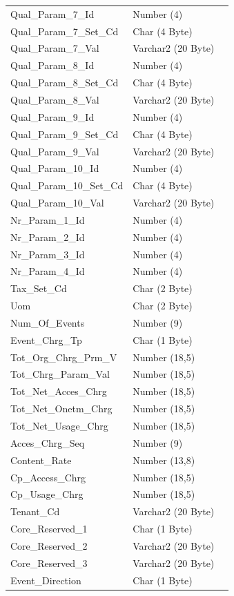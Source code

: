 \documentclass[12pt,twoside]{article}
\begin{document}
\begin{longtable}{l|l|l}
Qual\_Param\_7\_Id & Number (4) & \\
Qual\_Param\_7\_Set\_Cd & Char (4 Byte) & \\
Qual\_Param\_7\_Val & Varchar2 (20 Byte) & \\
Qual\_Param\_8\_Id & Number (4) & \\
Qual\_Param\_8\_Set\_Cd & Char (4 Byte) & \\
Qual\_Param\_8\_Val & Varchar2 (20 Byte) & \\
Qual\_Param\_9\_Id & Number (4) & \\
Qual\_Param\_9\_Set\_Cd & Char (4 Byte) & \\
Qual\_Param\_9\_Val & Varchar2 (20 Byte) & \\
Qual\_Param\_10\_Id & Number (4) & \\
Qual\_Param\_10\_Set\_Cd & Char (4 Byte) & \\
Qual\_Param\_10\_Val & Varchar2 (20 Byte) & \\
Nr\_Param\_1\_Id & Number (4) & \\
Nr\_Param\_2\_Id & Number (4) & \\
Nr\_Param\_3\_Id & Number (4) & \\
Nr\_Param\_4\_Id & Number (4) & \\
Tax\_Set\_Cd & Char (2 Byte) & \\
Uom & Char (2 Byte) & \\
Num\_Of\_Events & Number (9) & \\
Event\_Chrg\_Tp & Char (1 Byte) & \\
Tot\_Org\_Chrg\_Prm\_V & Number (18,5) & \\
Tot\_Chrg\_Param\_Val & Number (18,5) & \\
Tot\_Net\_Acces\_Chrg & Number (18,5) & \\
Tot\_Net\_Onetm\_Chrg & Number (18,5) & \\
Tot\_Net\_Usage\_Chrg & Number (18,5) & \\
Acces\_Chrg\_Seq & Number (9) & \\
Content\_Rate & Number (13,8) & \\
Cp\_Access\_Chrg & Number (18,5) & \\
Cp\_Usage\_Chrg & Number (18,5) & \\
Tenant\_Cd & Varchar2 (20 Byte) & \\
Core\_Reserved\_1 & Char (1 Byte) & \\
Core\_Reserved\_2 & Varchar2 (20 Byte) & \\
Core\_Reserved\_3 & Varchar2 (20 Byte) & \\
Event\_Direction & Char (1 Byte) & \\
\hline
\end{longtable}
\normalsize
\end{document}
